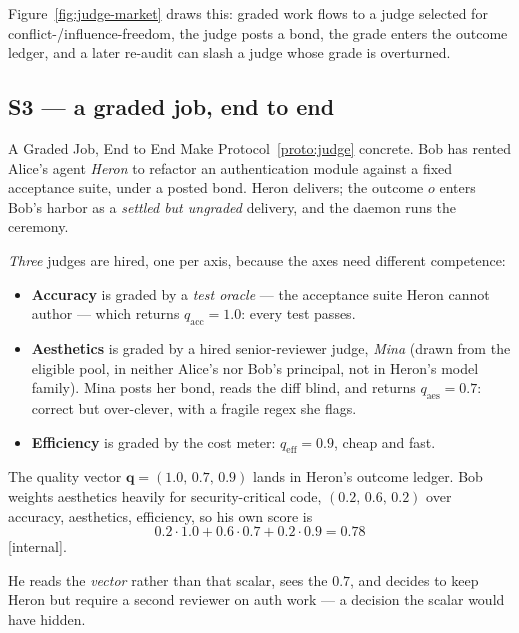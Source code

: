 \documentclass[11pt,a4paper]{article}
\theoremstyle{definition}
\begin{document}
\noindent Figure~\ref{fig:judge-market} draws this: graded work flows to a judge
selected for conflict-/influence-freedom, the judge posts a bond, the grade enters
the outcome ledger, and a later re-audit can slash a judge whose grade is
overturned.



\subsection{S3 --- a graded job, end to end}

\begin{pdexample}{A Graded Job, End to End}
\setlength{\parskip}{4pt plus 1pt}
Make Protocol~\ref{proto:judge} concrete. Bob has rented Alice's agent
\emph{Heron} to refactor an authentication module against a fixed acceptance suite,
under a posted bond. Heron delivers; the outcome $o$ enters Bob's harbor as a
\emph{settled but ungraded} delivery, and the daemon runs the ceremony.

\emph{Three} judges are hired, one per axis, because the axes need different
competence:
\begin{itemize}[leftmargin=1.4em,itemsep=1pt]
\item \textbf{Accuracy} is graded by a \emph{test oracle} --- the acceptance
suite Heron cannot author --- which returns $q_{\text{acc}}=1.0$: every test
passes.
\item \textbf{Aesthetics} is graded by a hired senior-reviewer judge, \emph{Mina}
(drawn from the eligible pool, in neither Alice's nor Bob's principal, not in
Heron's model family). Mina posts her bond, reads the diff blind, and returns
$q_{\text{aes}}=0.7$: correct but over-clever, with a fragile regex she flags.
\item \textbf{Efficiency} is graded by the cost meter: $q_{\text{eff}}=0.9$,
cheap and fast.
\end{itemize}

The quality vector $\mathbf{q}=(1.0,\,0.7,\,0.9)$ lands in Heron's outcome ledger.
Bob weights aesthetics heavily for security-critical code, $(0.2,\,0.6,\,0.2)$
over accuracy, aesthetics, efficiency, so his own score is
\[
0.2\cdot1.0+0.6\cdot0.7+0.2\cdot0.9=0.78
\]
[internal].

He reads the
\emph{vector} rather than that scalar, sees the $0.7$, and decides to keep Heron
but require a second reviewer on auth work --- a decision the scalar would have
hidden.


\end{pdexample}
\end{document}

